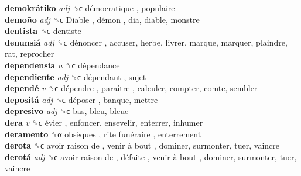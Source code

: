 \textbf{demokrátiko} \emph{adj}  ␝ϲ   démocratique , populaire  \\
\textbf{demoño} \emph{adj}  ␝ϲ   Diable ,  démon , dia, diable, monstre  \\
\textbf{dentista} ␝ϲ  dentiste  \\
\textbf{denunsiá} \emph{adj}  ␝ϲ   dénoncer , accuser, herbe, livrer, marque, marquer, plaindre, rat, reprocher  \\
\textbf{dependensia} \emph{n}  ␝ϲ   dépendance   \\
\textbf{dependiente} \emph{adj}  ␝ϲ   dépendant , sujet  \\
\textbf{dependé} \emph{v}  ␝ϲ   dépendre ,  paraître , calculer, compter, comte, sembler  \\
\textbf{depositá} \emph{adj}  ␝ϲ   déposer , banque, mettre  \\
\textbf{depresivo} \emph{adj}  ␝ϲ  bas, bleu, bleue  \\
\textbf{dera} \emph{v}  ␝ϲ   évier , enfoncer, ensevelir, enterrer, inhumer  \\
\textbf{deramento} ␝α   obsèques ,  rite funéraire , enterrement  \\
\textbf{derota} ␝ϲ   avoir raison de ,  venir à bout , dominer, surmonter, tuer, vaincre  \\
\textbf{derotá} \emph{adj}  ␝ϲ   avoir raison de ,  défaite ,  venir à bout , dominer, surmonter, tuer, vaincre  \\
